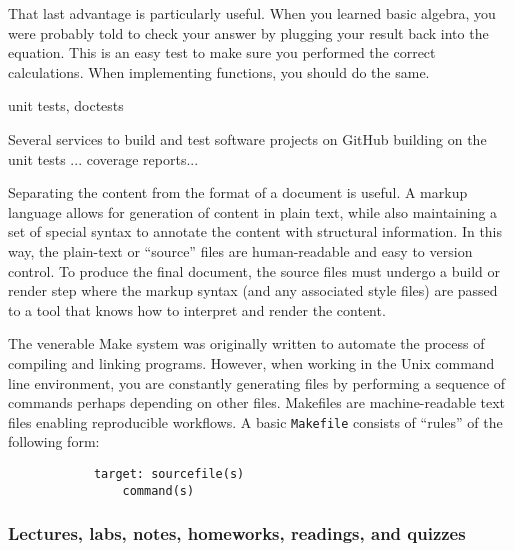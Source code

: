That last advantage is particularly useful.
When you learned basic algebra, you were probably told to check your answer by
plugging your result back into the equation.
This is an easy test to make sure you performed the correct calculations. 
When implementing functions, you should do the same.

unit tests, doctests


Several services to build and test software projects on GitHub 
building on the unit tests ...
coverage reports...

Separating the content from the format of a document is useful.
A markup language allows for generation of content in plain text, while also
maintaining a set of special syntax to annotate the content with structural
information.
In this way, the plain-text or ``source'' files are human-readable and easy to
version control.
To produce the final document, the source files must undergo a build or render
step where the markup syntax (and any associated style files) are passed to a
tool that knows how to interpret and render the content.


The venerable Make system was originally written to automate the process
of compiling and linking programs.
However, when working in the Unix command line environment, you are constantly
generating files by performing a sequence of commands perhaps depending on
other files.
Makefiles are machine-readable text files enabling reproducible workflows.
A basic \texttt{Makefile} consists of ``rules'' of the following form:
\begin{verbatim}
            target: sourcefile(s)
                command(s)
\end{verbatim}


\subsubsection{Lectures, labs, notes, homeworks, readings, and quizzes}

